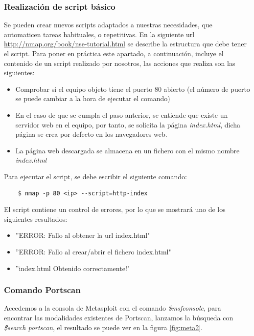\documentclass[a4,12pt,onecolum]{article}
\begin{document}
\subsubsection{Realización de script básico}
Se pueden crear nuevos scripts adaptados a nuestras necesidades, que automaticen tareas habituales, o repetitivas. En la siguiente url \url{http://nmap.org/book/nse-tutorial.html} se describe la estructura que debe tener el script. Para poner en práctica este apartado, a continuación, incluye el contenido de un script realizado por nosotros, las acciones que realiza son las siguientes:
\begin{itemize}
\item Comprobar si el equipo objeto tiene el puerto 80 abierto (el número de puerto se puede cambiar a la hora de ejecutar el comando)
\item En el caso de que se cumpla el paso anterior, se entiende que existe un servidor web en el equipo, por tanto, se solicita la página \textit{index.html}, dicha página se crea por defecto en los navegadores web.
\item La página web descargada se almacena en un fichero con el mismo nombre \textit{index.html}
\end{itemize}
Para ejecutar el script, se debe escribir el siguiente comando:
\begin{verbatim}
	$ nmap -p 80 <ip> --script=http-index
\end{verbatim}

El script contiene un control de errores, por lo que se mostrará uno de los siguientes resultados:
\begin{itemize}
	\item ''ERROR: Fallo al obtener la url index.html"
	\item ''ERROR: Fallo al crear/abrir el fichero index.html"
	\item ''index.html Obtenido correctamente!"
\end{itemize}


\subsubsection{Comando Portscan}
Accedemos a la consola de Metasploit con el comando \emph{\$msfconsole}, para encontrar las modalidades existentes de Portscan, lanzamos la búsqueda con \emph{\$search portscan}, el resultado se puede ver en la figura \ref{fig:meta2}.
\end{document}
